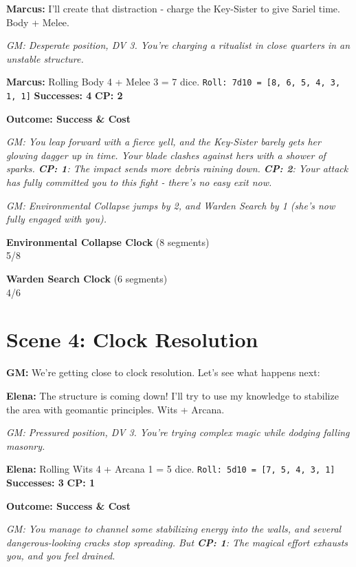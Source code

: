 \documentclass[11pt]{article}
\newcommand{\player}[1]{\textbf{#1:}}
\newcommand{\gm}[1]{\textit{GM: #1}}
\newcommand{\roll}[2]{\texttt{Roll: #1d10 = [#2]}}
\newcommand{\success}[1]{\textbf{Successes: #1}}
\newcommand{\cp}[1]{\textbf{CP: #1}}
\newcommand{\outcome}[1]{\textbf{Outcome: #1}}
\newcommand{\clocksegment}{\textbullet}
\begin{document}
\player{Marcus} I'll create that distraction - charge the Key-Sister to give Sariel time. Body + Melee.

\gm{Desperate position, DV 3. You're charging a ritualist in close quarters in an unstable structure.}

\player{Marcus} Rolling Body 4 + Melee 3 = 7 dice. \roll{7}{8, 6, 5, 4, 3, 1, 1} \success{4} \cp{2}

\outcome{Success \& Cost}

\gm{You leap forward with a fierce yell, and the Key-Sister barely gets her glowing dagger up in time. Your blade clashes against hers with a shower of sparks. \cp{1}: The impact sends more debris raining down. \cp{2}: Your attack has fully committed you to this fight - there's no easy exit now.}

\gm{Environmental Collapse jumps by 2, and Warden Search by 1 (she's now fully engaged with you).}

\begin{center}
\textbf{Environmental Collapse Clock} (8 segments)\\
\fbox{\textcolor{clockcolor}{\clocksegment\clocksegment\clocksegment\clocksegment\clocksegment}\clocksegment\clocksegment\clocksegment} 5/8
\end{center}

\begin{center}
\textbf{Warden Search Clock} (6 segments)\\
\fbox{\textcolor{clockcolor}{\clocksegment\clocksegment\clocksegment\clocksegment}\clocksegment\clocksegment} 4/6
\end{center}

\section*{Scene 4: Clock Resolution}

\player{GM} We're getting close to clock resolution. Let's see what happens next:

\player{Elena} The structure is coming down! I'll try to use my knowledge to stabilize the area with geomantic principles. Wits + Arcana.

\gm{Pressured position, DV 3. You're trying complex magic while dodging falling masonry.}

\player{Elena} Rolling Wits 4 + Arcana 1 = 5 dice. \roll{5}{7, 5, 4, 3, 1} \success{3} \cp{1}

\outcome{Success \& Cost}

\gm{You manage to channel some stabilizing energy into the walls, and several dangerous-looking cracks stop spreading. But \cp{1}: The magical effort exhausts you, and you feel drained.}
\end{document}
